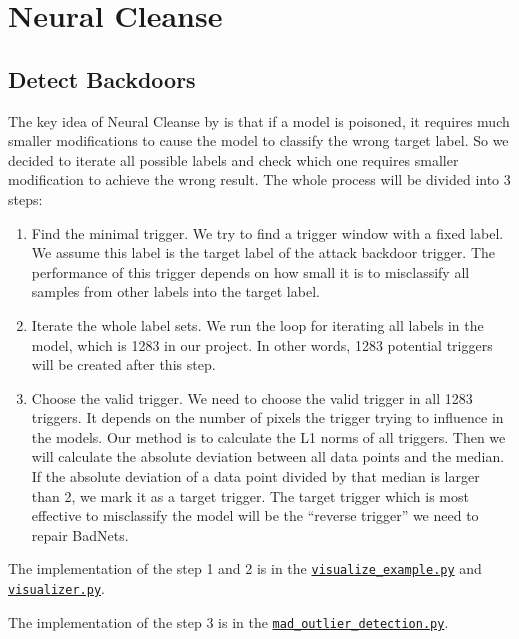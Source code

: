 \documentclass[letterpaper]{article}
\begin{document}
\section*{Neural Cleanse}
\subsection*{Detect Backdoors}
The key idea of Neural Cleanse\footnotemark{} by  \cite{wang2019neural} is that if a model is poisoned, it requires much smaller modifications to cause the model to classify the wrong target label. So we decided to iterate all possible labels and check which one requires smaller modification to achieve the wrong result. The whole process will be divided into 3 steps:

\begin{enumerate}
    \item Find the minimal trigger. We try to find a trigger window with a fixed label. We assume this label is the target label of the attack backdoor trigger. The performance of this trigger depends on how small it is to misclassify all samples from other labels into the target label.
    
    \item Iterate the whole label sets. We run the loop for iterating all labels in the model, which is 1283 in our project. In other words, 1283 potential triggers will be created after this step.
    
    \item Choose the valid trigger. We need to choose the valid trigger in all 1283 triggers. It depends on the number of pixels the trigger trying to influence in the models. Our method is to calculate the L1 norms of all triggers. Then we will calculate the absolute deviation between all data points and the median. If the absolute deviation of a data point divided by that median is larger than 2, we mark it as a target trigger. The target trigger which is most effective to misclassify the model will be the ``reverse trigger'' we need to repair BadNets.
\end{enumerate}
The implementation of the step 1 and 2 is in the \href{https://github.com/zjzsliyang/CSAW-HackML-2020/blob/master/visualize_example.py}{\texttt{visualize\_example.py}} and \href{https://github.com/zjzsliyang/CSAW-HackML-2020/blob/master/visualizer.py}{\texttt{visualizer.py}}.

The implementation of the step 3 is in the \href{https://github.com/zjzsliyang/CSAW-HackML-2020/blob/master/mad_outlier_detection.py}{\texttt{mad\_outlier\_detection.py}}.
\end{document}
